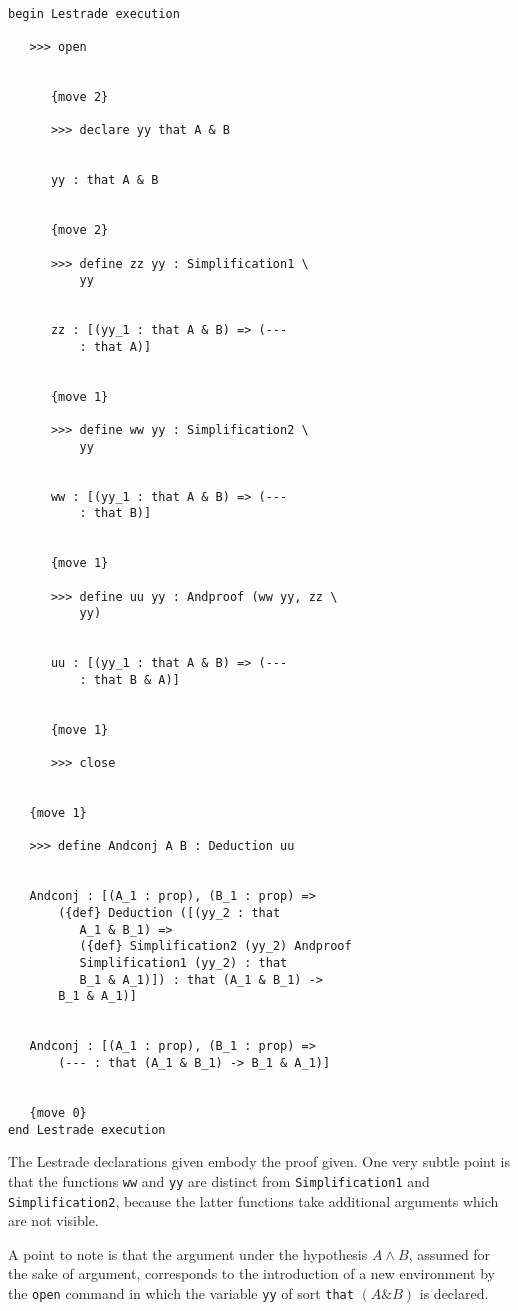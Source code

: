 \documentclass[12pt]{article}
\begin{document}
\begin{verbatim}

begin Lestrade execution

   >>> open


      {move 2}

      >>> declare yy that A & B


      yy : that A & B


      {move 2}

      >>> define zz yy : Simplification1 \
          yy


      zz : [(yy_1 : that A & B) => (--- 
          : that A)]


      {move 1}

      >>> define ww yy : Simplification2 \
          yy


      ww : [(yy_1 : that A & B) => (--- 
          : that B)]


      {move 1}

      >>> define uu yy : Andproof (ww yy, zz \
          yy)


      uu : [(yy_1 : that A & B) => (--- 
          : that B & A)]


      {move 1}

      >>> close


   {move 1}

   >>> define Andconj A B : Deduction uu


   Andconj : [(A_1 : prop), (B_1 : prop) => 
       ({def} Deduction ([(yy_2 : that 
          A_1 & B_1) => 
          ({def} Simplification2 (yy_2) Andproof 
          Simplification1 (yy_2) : that 
          B_1 & A_1)]) : that (A_1 & B_1) -> 
       B_1 & A_1)]


   Andconj : [(A_1 : prop), (B_1 : prop) => 
       (--- : that (A_1 & B_1) -> B_1 & A_1)]


   {move 0}
end Lestrade execution
\end{verbatim}

The Lestrade declarations given embody the proof given.  One very subtle point is that the functions {\tt ww} and {\tt yy} are
distinct from {\tt Simplification1} and {\tt Simplification2}, because the latter functions take additional arguments which are not visible.

A point to note is that the argument under the hypothesis $A \wedge B$, assumed for the sake of argument, corresponds to the introduction of a new environment by the {\tt open} command in which the variable {\tt yy} of sort {\tt that} $(A \& B)$ is declared.
\end{document}
